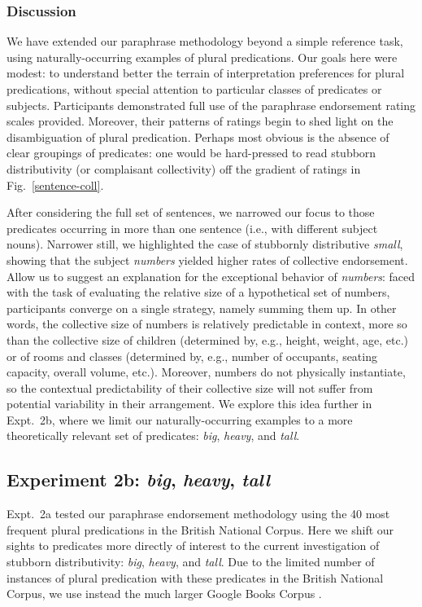\documentclass[linguex]{sp}
\begin{document}
\subsubsection{Discussion}

We have extended our paraphrase methodology beyond a simple reference task, using naturally-occurring examples of plural predications. Our goals here were modest: to understand better the terrain of interpretation preferences for plural predications, without special attention to particular classes of predicates or subjects. Participants demonstrated full use of the paraphrase endorsement rating scales provided. Moreover, their patterns of ratings begin to shed light on the disambiguation of plural predication. Perhaps most obvious is the absence of clear groupings of predicates: one would be hard-pressed to read stubborn distributivity (or complaisant collectivity) off the gradient of ratings in Fig.~\ref{sentence-coll}.

After considering the full set of sentences, we narrowed our focus to those predicates occurring in more than one sentence (i.e., with different subject nouns). Narrower still, we highlighted the case of stubbornly distributive \emph{small}, showing that the subject \emph{numbers} yielded higher rates of collective endorsement. Allow us to suggest an explanation for the exceptional behavior of \emph{numbers}: faced with the task of evaluating the relative size of a hypothetical set of numbers, participants converge on a single strategy, namely summing them up. In other words, the collective size of numbers is relatively predictable in context, more so than the collective size of children (determined by, e.g., height, weight, age, etc.) or of rooms and classes (determined by, e.g., number of occupants, seating capacity, overall volume, etc.). Moreover, numbers do not physically instantiate, so the contextual predictability of their collective size will not suffer from potential variability in their arrangement. We explore this idea further in Expt.~2b, where we limit our naturally-occurring examples to a more theoretically relevant set of predicates: \emph{big}, \emph{heavy}, and \emph{tall}.

\subsection{Experiment 2b: \emph{big}, \emph{heavy}, \emph{tall}}

Expt.~2a tested our paraphrase endorsement methodology using the 40 most frequent plural predications in the British National Corpus. Here we shift our sights to predicates more directly of interest to the current investigation of stubborn distributivity: \emph{big}, \emph{heavy}, and \emph{tall}. Due to the limited number of instances of plural predication with these predicates in the British National Corpus, we use instead the much larger Google Books Corpus \citep{davies2011}.
\end{document}
